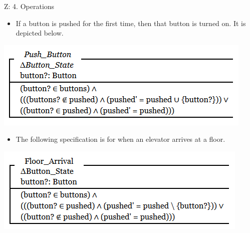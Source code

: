 \documentclass{beamer}
\begin{document}
	\begin{frame}{Z: 4. Operations}
    	\begin{itemize}
            \item If a button is pushed for the first time, then that button is turned on. It is depicted below.
	    \end{itemize}
	    \includegraphics[scale=0.5]{img/03_z_push_button.png}
    	\begin{itemize}
            \item The following specification is for when an elevator arrives at a floor.
	    \end{itemize}
	    \includegraphics[scale=0.5]{img/03_z_floor_arrival.png}
	\end{frame}	
\end{document}

